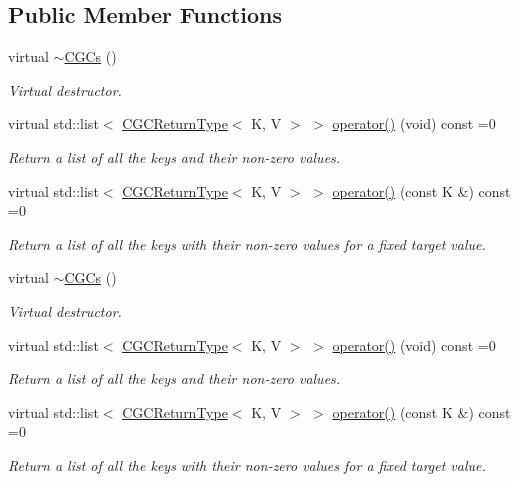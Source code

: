 \subsection*{Public Member Functions}
\begin{DoxyCompactItemize}
\item 
virtual \mbox{\hyperlink{classHadron_1_1CGCs_a882c1ea3451254725b9d86c598d6c29a}{$\sim$\+C\+G\+Cs}} ()
\begin{DoxyCompactList}\small\item\em Virtual destructor. \end{DoxyCompactList}\item 
virtual std\+::list$<$ \mbox{\hyperlink{structHadron_1_1CGCReturnType}{C\+G\+C\+Return\+Type}}$<$ K, V $>$ $>$ \mbox{\hyperlink{classHadron_1_1CGCs_ac709374b31c0319e82028b9d7c23e993}{operator()}} (void) const =0
\begin{DoxyCompactList}\small\item\em Return a list of all the keys and their non-\/zero values. \end{DoxyCompactList}\item 
virtual std\+::list$<$ \mbox{\hyperlink{structHadron_1_1CGCReturnType}{C\+G\+C\+Return\+Type}}$<$ K, V $>$ $>$ \mbox{\hyperlink{classHadron_1_1CGCs_a8d2d80be37b603359708ebdd5923ff47}{operator()}} (const K \&) const =0
\begin{DoxyCompactList}\small\item\em Return a list of all the keys with their non-\/zero values for a fixed target value. \end{DoxyCompactList}\item 
virtual \mbox{\hyperlink{classHadron_1_1CGCs_a882c1ea3451254725b9d86c598d6c29a}{$\sim$\+C\+G\+Cs}} ()
\begin{DoxyCompactList}\small\item\em Virtual destructor. \end{DoxyCompactList}\item 
virtual std\+::list$<$ \mbox{\hyperlink{structHadron_1_1CGCReturnType}{C\+G\+C\+Return\+Type}}$<$ K, V $>$ $>$ \mbox{\hyperlink{classHadron_1_1CGCs_ac709374b31c0319e82028b9d7c23e993}{operator()}} (void) const =0
\begin{DoxyCompactList}\small\item\em Return a list of all the keys and their non-\/zero values. \end{DoxyCompactList}\item 
virtual std\+::list$<$ \mbox{\hyperlink{structHadron_1_1CGCReturnType}{C\+G\+C\+Return\+Type}}$<$ K, V $>$ $>$ \mbox{\hyperlink{classHadron_1_1CGCs_a8d2d80be37b603359708ebdd5923ff47}{operator()}} (const K \&) const =0
\begin{DoxyCompactList}\small\item\em Return a list of all the keys with their non-\/zero values for a fixed target value. \end{DoxyCompactList}\end{DoxyCompactItemize}


